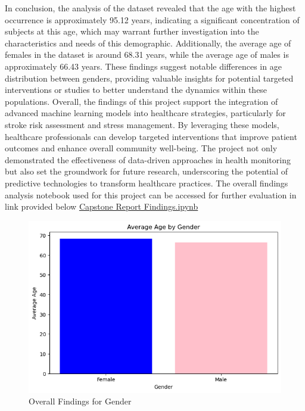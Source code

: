 \documentclass[runningheads]{llncs}
\begin{document}
\begin{enumerate}
In conclusion, the analysis of the dataset revealed that the age with the highest occurrence is approximately 95.12 years, indicating a significant concentration of subjects at this age, which may warrant further investigation into the characteristics and needs of this demographic. Additionally, the average age of females in the dataset is around 68.31 years, while the average age of males is approximately 66.43 years. These findings suggest notable differences in age distribution between genders, providing valuable insights for potential targeted interventions or studies to better understand the dynamics within these populations. Overall, the findings of this project support the integration of advanced machine learning models into healthcare strategies, particularly for stroke risk assessment and stress management. By leveraging these models, healthcare professionals can develop targeted interventions that improve patient outcomes and enhance overall community well-being. The project not only demonstrated the effectiveness of data-driven approaches in health monitoring but also set the groundwork for future research, underscoring the potential of predictive technologies to transform healthcare practices.
The overall findings analysis notebook used for this project can be accessed for further evaluation in link provided below \href{https://github.com/alvaroquintero28/Capstone-Project-Report/blob/main/findings.ipynb}{Capstone Report Findings.ipynb}

\begin{figure}
    \centering
    \includegraphics[width=1.0\linewidth]{findings.png}
    \caption{Overall Findings for Gender} 
    \label{fig:enter-label}
\end{figure}


\end{enumerate}
\end{document}
